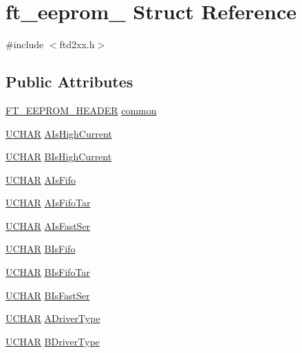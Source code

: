 \hypertarget{structft__eeprom__2232}{
\section{ft\_\-eeprom\_ Struct Reference}
\label{structft__eeprom__2232}
}


{\ttfamily \#include $<$ftd2xx.h$>$}\subsection*{Public Attributes}
\begin{DoxyCompactItemize}
\item 
\hyperlink{structft__eeprom__header}{FT\_\-EEPROM\_\-HEADER} \hyperlink{structft__eeprom__2232_a6b294dc09899eb022f2e949b3d5c4972}{common}
\item 
\hyperlink{LALUsbx64_2include_2WinTypes_8h_a4f4bb67531a9bf6f0b9c6ad76aeba587}{UCHAR} \hyperlink{structft__eeprom__2232_a66f55cd8947dc7015515038a35495ddc}{AIsHighCurrent}
\item 
\hyperlink{LALUsbx64_2include_2WinTypes_8h_a4f4bb67531a9bf6f0b9c6ad76aeba587}{UCHAR} \hyperlink{structft__eeprom__2232_a2d7b4af1ab0e3b0084e13b83f513b5d5}{BIsHighCurrent}
\item 
\hyperlink{LALUsbx64_2include_2WinTypes_8h_a4f4bb67531a9bf6f0b9c6ad76aeba587}{UCHAR} \hyperlink{structft__eeprom__2232_acf4ea789894df80107249291ac055a6f}{AIsFifo}
\item 
\hyperlink{LALUsbx64_2include_2WinTypes_8h_a4f4bb67531a9bf6f0b9c6ad76aeba587}{UCHAR} \hyperlink{structft__eeprom__2232_a6b3aab2f52076295cc32a5a785194b78}{AIsFifoTar}
\item 
\hyperlink{LALUsbx64_2include_2WinTypes_8h_a4f4bb67531a9bf6f0b9c6ad76aeba587}{UCHAR} \hyperlink{structft__eeprom__2232_acbcbf6335afad8a22eac6a575f385785}{AIsFastSer}
\item 
\hyperlink{LALUsbx64_2include_2WinTypes_8h_a4f4bb67531a9bf6f0b9c6ad76aeba587}{UCHAR} \hyperlink{structft__eeprom__2232_a090431f3dee969f1fd88cf30aabffe2f}{BIsFifo}
\item 
\hyperlink{LALUsbx64_2include_2WinTypes_8h_a4f4bb67531a9bf6f0b9c6ad76aeba587}{UCHAR} \hyperlink{structft__eeprom__2232_a576a9319f978ff28d3bb0a042d6196a8}{BIsFifoTar}
\item 
\hyperlink{LALUsbx64_2include_2WinTypes_8h_a4f4bb67531a9bf6f0b9c6ad76aeba587}{UCHAR} \hyperlink{structft__eeprom__2232_a33a65a0fbacf825f9af5903b834b9ab2}{BIsFastSer}
\item 
\hyperlink{LALUsbx64_2include_2WinTypes_8h_a4f4bb67531a9bf6f0b9c6ad76aeba587}{UCHAR} \hyperlink{structft__eeprom__2232_ad86a60a990160e5976e563365b7d05d0}{ADriverType}
\item 
\hyperlink{LALUsbx64_2include_2WinTypes_8h_a4f4bb67531a9bf6f0b9c6ad76aeba587}{UCHAR} \hyperlink{structft__eeprom__2232_a74407077c9097bf480f560b0511daf79}{BDriverType}
\end{DoxyCompactItemize}


